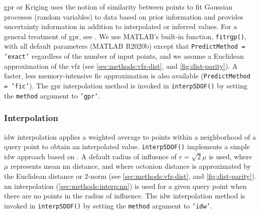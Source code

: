 \documentclass[final,twocolumn,12pt]{elsarticle}
\newcommand{\inpt}{input}
\begin{document}

\Gls{gpr} or Kriging uses the notion of similarity between points to fit Gaussian processes (random variables) to data based on prior information and provides uncertainty information in addition to interpolated or inferred values. For a general treatment of \gls{gpr}, see \cite{rasmussenGaussianProcessesMachine2006}. We use MATLAB's built-in function, \texttt{fitrgp()}, with all default parameters (MATLAB R2020b) except that \texttt{PredictMethod = 'exact'} regardless of the number of \inpt{} points, and we assume a Euclidean approximation of the \gls{vfz} (see \cref{sec:methods:vfz-dist}, and \cref{fig:dist-parity}). A faster, less memory-intensive \gls{fic} approximation is also available (\texttt{PredictMethod = 'fic'}). The \gls{gpr} interpolation method is invoked in \texttt{interp5DOF()} by setting the \texttt{method} argument to \texttt{'gpr'}.

\subsubsection{ Interpolation}
\label{sec:methods:interp:idw}


\Gls{idw} interpolation applies a weighted average to points within a neighborhood of a query point to obtain an interpolated value. \texttt{interp5DOF()} implements a simple \gls{idw} approach based on \cite{tovarInverseDistanceWeight2020}. A default radius of influence of $r=\sqrt{2} \mu$ is used, where $\mu$ represents mean \gls{nn} distance, and where octonion distance is approximated by the Euclidean distance or 2-norm (see \cref{sec:methods:vfz-dist}, and \cref{fig:dist-parity}). \gls{nn} interpolation (\cref{sec:methods:interp:nn}) is used for a given query point when there are no points in the radius of influence. The \gls{idw} interpolation method is invoked in \texttt{interp5DOF()} by setting the \texttt{method} argument to \texttt{'idw'}.
\end{document}
